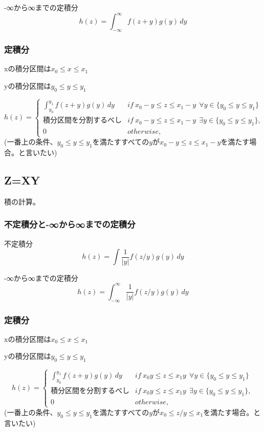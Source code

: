 \documentclass[a4paper,11pt]{ltjsarticle}
\begin{document}
-∞から∞までの定積分
$$
    h(z) = \int_{-\infty}^{\infty} f(z+y) g(y)\,dy
$$
\subsubsection{定積分}
\begin{description}
    \item xの積分区間は$x_0 \leq x \leq x_1$
    \item yの積分区間は$y_0 \leq y \leq y_1$
\end{description}
$$
    h(z)=
    \begin{cases}
        \int_{y_0}^{y_1} f(z+y) g(y)\,dy    & if\ x_0-y \leq z \leq x_1-y \ \ \forall y\in \{ y_0 \leq y \leq y_1\}\\
        積分区間を分割するべし                & if\ x_0-y \leq z \leq x_1-y \ \ \exists y\in \{ y_0 \leq y \leq y_1\}, \\
        0                                   & otherwise,
    \end{cases}
$$
(一番上の条件、$y_0 \leq y \leq y_1$を満たすすべての$y$が$x_0-y \leq z \leq x_1-y$を満たす場合。と言いたい)


\subsection{Z=XY}
積の計算。
\subsubsection{不定積分と-∞から∞までの定積分}
不定積分
$$
    h(z) = \int \frac{1}{|y|} f(z/y) g(y)\,dy
$$

-∞から∞までの定積分
$$
    h(z) = \int_{-\infty}^{\infty} \frac{1}{|y|} f(z/y) g(y)\,dy
$$
\subsubsection{定積分}
\begin{description}
    \item xの積分区間は$x_0 \leq x \leq x_1$
    \item yの積分区間は$y_0 \leq y \leq y_1$
\end{description}
$$
    h(z)=
    \begin{cases}
        \int_{y_0}^{y_1} f(z+y) g(y)\,dy    & if\ x_0y \leq z \leq x_1y \ \ \forall y\in \{ y_0 \leq y \leq y_1\}\\
        積分区間を分割するべし                & if\ x_0y \leq z \leq x_1y \ \ \exists y\in \{ y_0 \leq y \leq y_1\}, \\
        0                                   & otherwise,
    \end{cases}
$$
(一番上の条件、$y_0 \leq y \leq y_1$を満たすすべての$y$が$x_0 \leq z/y \leq x_1$を満たす場合。と言いたい)
\end{document}
